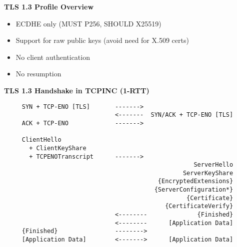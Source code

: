 \documentclass[helvetica]{seminar}
\newcommand{\heading}[1]{%
  \begin{center} 
    \large\bf 
    #1 
  \end{center} 
  \vspace{.4 in}}
\begin{document}
\begin{slide}
\heading{TLS 1.3 Profile Overview}

\begin{itemize}
\item ECDHE only (MUST P256, SHOULD X25519)
\item Support for raw public keys (avoid need for X.509 certs)
\item No client authentication
\item No resumption
\end{itemize}
\end{slide}

\begin{slide}
\heading{TLS 1.3 Handshake in TCPINC (1-RTT)}

\begin{scriptsize}
\begin{verbatim}
     SYN + TCP-ENO [TLS]       ------->
                               <-------  SYN/ACK + TCP-ENO [TLS]
     ACK + TCP-ENO             ------->

     ClientHello
       + ClientKeyShare
       + TCPENOTranscript      ------->
                                                     ServerHello
                                                  ServerKeyShare
                                           {EncryptedExtensions}
                                          {ServerConfiguration*}
                                                   {Certificate}
                                             {CertificateVerify}
                               <--------              {Finished}
                               <--------      [Application Data]
     {Finished}                -------->
     [Application Data]        <------->      [Application Data]
\end{verbatim}
\end{scriptsize}
\end{slide}


\begin{slide}
\heading{}

\end{slide}
\end{document}
